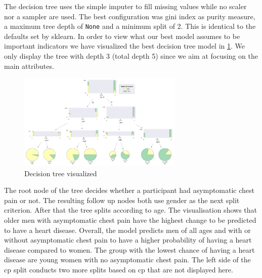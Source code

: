 The decision tree uses the simple imputer to fill missing values while no scaler nor a sampler are used. The best configuration was gini index as purity measure, a maximum tree depth of \texttt{None} and a minimum split of 2. This is identical to the defaults set by sklearn. 
In order to view what our best model assumes to be important indicators we have visualized the best decision tree model in \cref{fig:DecisionTree}. We only display the tree with depth 3 (total depth 5) since we aim at focusing on the main attributes. 
\begin{figure}[h]
	\centering
	\includegraphics[width=0.7\textwidth]{images/DecisionTree.png}
	\caption{Decision tree visualized}
	\label{fig:DecisionTree}
\end{figure}

The root node of the tree decides whether a participant had asymptomatic chest pain or not. The resulting follow up nodes both use gender as the next split criterion. After that the tree splits according to age. The visualisation shows that older men with asymptomatic chest pain have the highest change to be predicted to have a heart disease. Overall, the model predicts men of all ages and with or without asymptomatic chest pain to have a higher probability of having a heart disease compared to women. The group with the lowest chance of having a heart disease are young women with no asymptomatic chest pain. The left side of the cp split conducts two more splits based on cp that are not displayed here. 